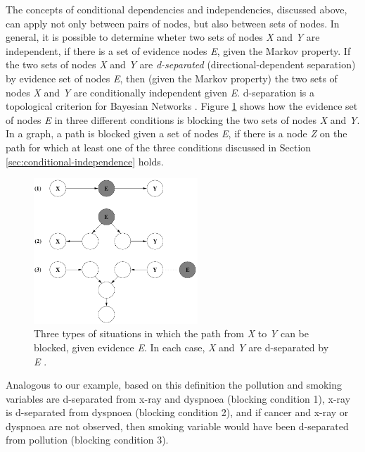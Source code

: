 \documentclass[11pt]{article}
\begin{document}
The concepts of conditional dependencies and independencies, discussed above,
can apply not only between pairs of nodes, but also between sets of nodes. In
general, it is possible to determine wheter two sets of nodes \textit{X} and
\textit{Y} are independent, if there is a set of evidence nodes \textit{E},
given the Markov property. If the two sets of nodes \textit{X} and \textit{Y}
are \textit{d-separated} (directional-dependent separation) by evidence set of
nodes \textit{E}, then (given the Markov property) the two sets of nodes
\textit{X} and \textit{Y} are conditionally independent given \textit{E}.
d-separation is a topological criterion for Bayesian Networks
\cite{russell:ai-modern}. Figure \ref{fig:d-separation} shows how the evidence
set of nodes \textit{E} in three different conditions is blocking the two sets
of nodes \textit{X} and \textit{Y}. In a graph, a path is blocked given a set of
nodes \textit{E}, if there is a node \textit{Z} on the path for which at least
one of the three conditions discussed in Section
\ref{sec:conditional-independence} holds.

\begin{figure}[tbh]
  \center
  \includegraphics[width=0.55\textwidth]{figure/d-separation.png}
  \caption{Three types of situations in which the path from \textit{X} to
  \textit{Y} can be blocked, given evidence \textit{E}. In each case, \textit{X}
  and \textit{Y} are d-separated by \textit{E}
  \cite{korb:bayesian-ai}.}
  \label{fig:d-separation}
\end{figure}

Analogous to our example, based on this definition the pollution and smoking
variables are d-separated from x-ray and dyspnoea (blocking condition 1), x-ray
is d-separated from dyspnoea (blocking condition 2), and if cancer and x-ray or
dyspnoea are not observed, then smoking variable would have been d-separated
from pollution (blocking condition 3).
\end{document}
